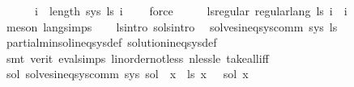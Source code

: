 \begin{isabellebody}
\ \ \ \ \ {\isasymand}\ {\isacharparenleft}{\kern0pt}{\isasymforall}i\ {\isasymge}\ length\ sys{\isachardot}{\kern0pt}\ {\isacharquery}{\kern0pt}ls{\isacharprime}{\kern0pt}\ i\ {\isacharequal}{\kern0pt}\ {\isacharbraceleft}{\kern0pt}{\isacharbraceright}{\kern0pt}{\isacharparenright}{\kern0pt}{\isachardoublequoteclose}\ \isamarkupfalse%
\ force\isanewline
\ \ \isamarkupfalse%
\ \isamarkupfalse%
\ ls{\isacharprime}{\kern0pt}{\isacharunderscore}{\kern0pt}regular{\isacharcolon}{\kern0pt}\ {\isachardoublequoteopen}regular{\isacharunderscore}{\kern0pt}lang\ {\isacharparenleft}{\kern0pt}{\isacharquery}{\kern0pt}ls{\isacharprime}{\kern0pt}\ i{\isacharparenright}{\kern0pt}{\isachardoublequoteclose}\ \ i\ \isamarkupfalse%
\ {\isacharparenleft}{\kern0pt}meson\ lang{\isachardot}{\kern0pt}simps{\isacharparenleft}{\kern0pt}{}{\isacharparenright}{\kern0pt}{\isacharparenright}{\kern0pt}\isanewline
\ \ \isamarkupfalse%
\ ls{\isacharprime}{\kern0pt}{\isacharunderscore}{\kern0pt}intro\ sols{\isacharunderscore}{\kern0pt}intro\ \isamarkupfalse%
\ {\isachardoublequoteopen}solves{\isacharunderscore}{\kern0pt}ineq{\isacharunderscore}{\kern0pt}sys{\isacharunderscore}{\kern0pt}comm\ sys\ {\isacharquery}{\kern0pt}ls{\isacharprime}{\kern0pt}{\isachardoublequoteclose}\isanewline
\ \ \ \ \isamarkupfalse%
\ partial{\isacharunderscore}{\kern0pt}min{\isacharunderscore}{\kern0pt}sol{\isacharunderscore}{\kern0pt}ineq{\isacharunderscore}{\kern0pt}sys{\isacharunderscore}{\kern0pt}def\ solution{\isacharunderscore}{\kern0pt}ineq{\isacharunderscore}{\kern0pt}sys{\isacharunderscore}{\kern0pt}def\isanewline
\ \ \ \ \isamarkupfalse%
\ {\isacharparenleft}{\kern0pt}smt\ {\isacharparenleft}{\kern0pt}verit{\isacharparenright}{\kern0pt}\ eval{\isachardot}{\kern0pt}simps{\isacharparenleft}{\kern0pt}{}{\isacharparenright}{\kern0pt}\ linorder{\isacharunderscore}{\kern0pt}not{\isacharunderscore}{\kern0pt}less\ nless{\isacharunderscore}{\kern0pt}le\ take{\isacharunderscore}{\kern0pt}all{\isacharunderscore}{\kern0pt}iff{\isacharparenright}{\kern0pt}\isanewline
\ \ \isamarkupfalse%
\ \isamarkupfalse%
\ {\isachardoublequoteopen}{\isasymforall}sol{\isacharprime}{\kern0pt}{\isachardot}{\kern0pt}\ solves{\isacharunderscore}{\kern0pt}ineq{\isacharunderscore}{\kern0pt}sys{\isacharunderscore}{\kern0pt}comm\ sys\ sol{\isacharprime}{\kern0pt}\ {\isasymlongrightarrow}\ {\isacharparenleft}{\kern0pt}{\isasymforall}x{\isachardot}{\kern0pt}\ {\isasymPsi}\ {\isacharparenleft}{\kern0pt}{\isacharquery}{\kern0pt}ls{\isacharprime}{\kern0pt}\ x{\isacharparenright}{\kern0pt}\ {\isasymsubseteq}\ {\isasymPsi}\ {\isacharparenleft}{\kern0pt}sol{\isacharprime}{\kern0pt}\ x{\isacharparenright}{\kern0pt}{\isacharparenright}{\kern0pt}{\isachardoublequoteclose}\isanewline

\end{isabellebody}

